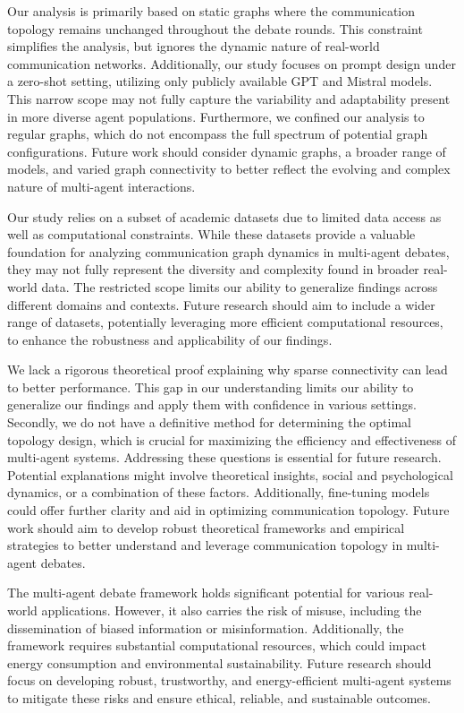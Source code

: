 \documentclass[11pt]{article}
\begin{document}
Our analysis is primarily based on static graphs where the communication topology remains unchanged throughout the debate rounds. This constraint simplifies the analysis, but ignores the dynamic nature of real-world communication networks. Additionally, our study focuses on prompt design under a zero-shot setting, utilizing only publicly available GPT and Mistral models. This narrow scope may not fully capture the variability and adaptability present in more diverse agent populations. Furthermore, we confined our analysis to regular graphs, which do not encompass the full spectrum of potential graph configurations. Future work should consider dynamic graphs, a broader range of models, and varied graph connectivity to better reflect the evolving and complex nature of multi-agent interactions.

Our study relies on a subset of academic datasets due to limited data access as well as computational constraints. While these datasets provide a valuable foundation for analyzing communication graph dynamics in multi-agent debates, they may not fully represent the diversity and complexity found in broader real-world data. The restricted scope limits our ability to generalize findings across different domains and contexts. Future research should aim to include a wider range of datasets, potentially leveraging more efficient computational resources, to enhance the robustness and applicability of our findings.

We lack a rigorous theoretical proof explaining why sparse connectivity can lead to better performance. This gap in our understanding limits our ability to generalize our findings and apply them with confidence in various settings. Secondly, we do not have a definitive method for determining the optimal topology design, which is crucial for maximizing the efficiency and effectiveness of multi-agent systems. Addressing these questions is essential for future research. Potential explanations might involve theoretical insights, social and psychological dynamics, or a combination of these factors. Additionally, fine-tuning models could offer further clarity and aid in optimizing communication topology. Future work should aim to develop robust theoretical frameworks and empirical strategies to better understand and leverage communication topology in multi-agent debates.

The multi-agent debate framework holds significant potential for various real-world applications. However, it also carries the risk of misuse, including the dissemination of biased information or misinformation. Additionally, the framework requires substantial computational resources, which could impact energy consumption and environmental sustainability. Future research should focus on developing robust, trustworthy, and energy-efficient multi-agent systems to mitigate these risks and ensure ethical, reliable, and sustainable outcomes.
\end{document}
